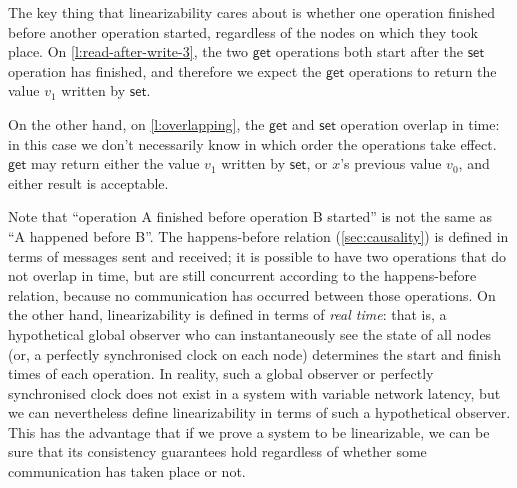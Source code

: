 The key thing that linearizability cares about is whether one operation finished before another operation started, regardless of the nodes on which they took place.
On \autoref{l:read-after-write-3}, the two $\mathsf{get}$ operations both start after the $\mathsf{set}$ operation has finished, and therefore we expect the $\mathsf{get}$ operations to return the value $v_1$ written by $\mathsf{set}$.

On the other hand, on \autoref{l:overlapping}, the $\mathsf{get}$ and $\mathsf{set}$ operation overlap in time: in this case we don't necessarily know in which order the operations take effect.
$\mathsf{get}$ may return either the value $v_1$ written by $\mathsf{set}$, or $x$'s previous value $v_0$, and either result is acceptable.

Note that ``operation A finished before operation B started'' is not the same as ``A happened before B''.
The happens-before relation (\autoref{sec:causality}) is defined in terms of messages sent and received; it is possible to have two operations that do not overlap in time, but are still concurrent according to the happens-before relation, because no communication has occurred between those operations.
On the other hand, linearizability is defined in terms of \emph{real time}: that is, a hypothetical global observer who can instantaneously see the state of all nodes (or, a perfectly synchronised clock on each node) determines the start and finish times of each operation.
In reality, such a global observer or perfectly synchronised clock does not exist in a system with variable network latency, but we can nevertheless define linearizability in terms of such a hypothetical observer.
This has the advantage that if we prove a system to be linearizable, we can be sure that its consistency guarantees hold regardless of whether some communication has taken place or not.

